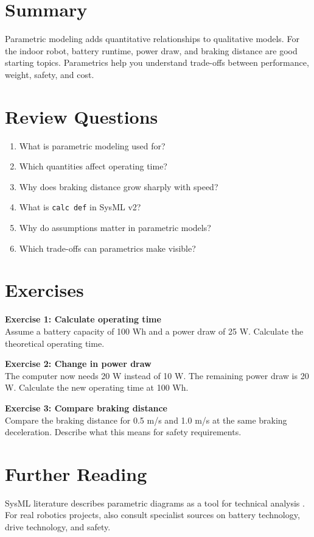 \section{Summary}
Parametric modeling adds quantitative relationships to qualitative models. For the indoor robot, battery runtime, power draw, and braking distance are good starting topics. Parametrics help you understand trade-offs between performance, weight, safety, and cost.

\section{Review Questions}
\begin{enumerate}
    \item What is parametric modeling used for?
    \item Which quantities affect operating time?
    \item Why does braking distance grow sharply with speed?
    \item What is \texttt{calc def} in SysML v2?
    \item Why do assumptions matter in parametric models?
    \item Which trade-offs can parametrics make visible?
\end{enumerate}

\section{Exercises}
\begin{uebungbox}
\textbf{Exercise 1: Calculate operating time}\\
Assume a battery capacity of 100 Wh and a power draw of 25 W. Calculate the theoretical operating time.
\end{uebungbox}

\begin{uebungbox}
\textbf{Exercise 2: Change in power draw}\\
The computer now needs 20 W instead of 10 W. The remaining power draw is 20 W. Calculate the new operating time at 100 Wh.
\end{uebungbox}

\begin{uebungbox}
\textbf{Exercise 3: Compare braking distance}\\
Compare the braking distance for 0.5 m/s and 1.0 m/s at the same braking deceleration. Describe what this means for safety requirements.
\end{uebungbox}

\section{Further Reading}
SysML literature describes parametric diagrams as a tool for technical analysis \cite{friedenthal2014}. For real robotics projects, also consult specialist sources on battery technology, drive technology, and safety.
